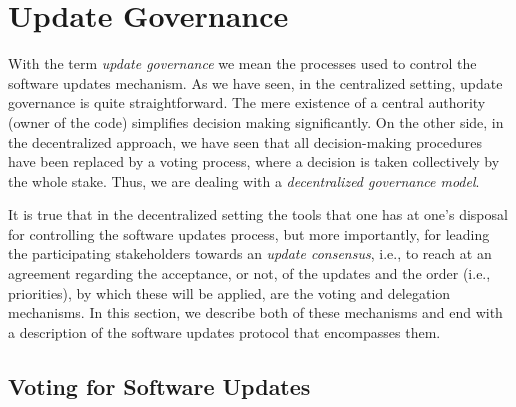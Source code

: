 \section{Update Governance}


With the term \emph{update governance} we mean the processes used to control the software updates mechanism. As we have seen, in the centralized setting, update governance is quite straightforward. The mere existence of a central authority (owner of the code) simplifies decision making significantly. On the other side, in the decentralized approach, we have seen that all decision-making procedures have been replaced by a voting process, where a decision is taken collectively by the whole stake. Thus, we are dealing with a \emph{decentralized governance model}.

It is true that in the decentralized setting the tools that one has at one's disposal for controlling the software updates process, but more importantly, for leading the participating stakeholders towards an \emph{update consensus}, i.e., to reach at an agreement regarding the acceptance, or not, of the updates and the order (i.e., priorities), by which these will be applied,  are the voting and delegation mechanisms. In this section, we describe both of these mechanisms and end with a description of the software updates protocol that encompasses them.

\subsection{Voting for Software Updates}



